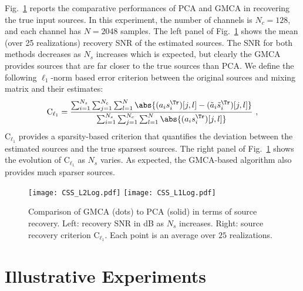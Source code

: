 Fig.\ \ref{fig:css_comp} reports the comparative performances of PCA and GMCA in recovering the true input sources. In this experiment, the number of channels is $N_c = 128$, and each channel has $N = 2048$ samples. The left panel of Fig.\ \ref{fig:css_comp} shows the mean (over 25 realizations) recovery SNR of the estimated sources. The SNR for both methods decreases as $N_s$ increases which is expected, but clearly the GMCA provides sources that are far closer to the true sources than PCA. We define the following $\ell_1$-norm based error criterion between the original sources and mixing matrix and their estimates:
\begin{equation}
\label{eq:lambdal1}
\mathrm{C}_{\ell_1} = \frac{\sum_{i=1}^{N_s}\sum_{j=1}^{N_c}\sum_{l=1}^N \abs{(a_i s_i^\Tr)[j,l] - (\tilde{a}_i \tilde{s}_i^\Tr)[j,l]}}{\sum_{i=1}^{N_s}\sum_{j=1}^{N_c}\sum_{l=1}^N \abs{(a_i s_i^\Tr)[j,l]}} ~ ,
\end{equation}
$\mathrm{C}_{\ell_1}$ provides a sparsity-based criterion that quantifies the deviation between the estimated sources and the true sparsest sources. 
The right panel of Fig.\ \ref{fig:css_comp} shows the evolution of $\mathrm{C}_{\ell_1}$ as $N_s$ varies. As expected, the GMCA-based algorithm also provides much sparser sources.

\begin{figure}[htb]
 \centerline{  
\texttt{[image: CSS\_L2Log.pdf]}
\texttt{[image: CSS\_L1Log.pdf]}
}
% 
\caption{Comparison of GMCA (dots) to PCA (solid) in terms of source recovery. Left: recovery SNR in dB as $N_s$ increases. Right: source recovery criterion $\mathrm{C}_{\ell_1}$. Each point is an average over $25$ realizations.} \label{fig:css_comp}
\end{figure} 


\section{Illustrative Experiments}
